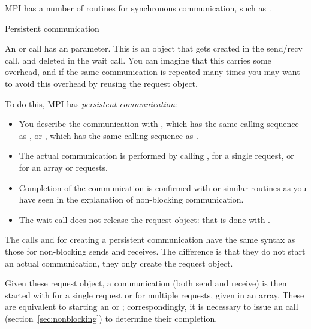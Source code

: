 MPI has a number of routines for synchronous communication,
such as .



 {Persistent communication}
\label{sec:persistent}

An  or  call has an  parameter.
This
is an object that gets created in the send/recv call, and deleted in
the wait call. You can imagine that this carries some overhead, and if
the same communication is repeated many times you may want to avoid
this overhead by reusing the request object.

To do this, MPI has \emph{persistent communication}:
\begin{itemize}
\item You describe the communication with
  , which has the same calling sequence as
  , or , which has the same
  calling sequence as .
\item The actual communication is performed by calling
  , for a single request, or
   for an array or requests.
\item Completion of the communication is confirmed with
   or similar routines as you have seen in the
  explanation of non-blocking communication.
\item The wait call does not release the request object: that is done
  with .
\end{itemize}

The calls  and 
for creating a persistent communication have the same syntax as 
those for non-blocking sends and receives. The difference is that they do not start
an actual communication, they only create the request object.
%
%
%

Given these request object, a communication (both send and receive) is then started
with  for a single request or  for 
multiple requests, given in an array.
%
%
%
These are equivalent to starting an  or ; correspondingly, 
it is necessary to issue an  call (section~\ref{sec:nonblocking})
to determine their completion.

